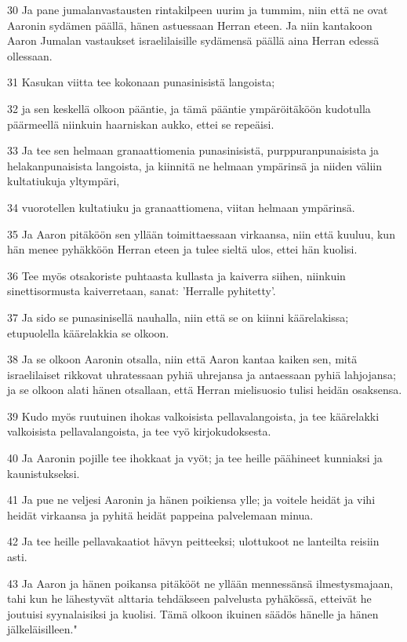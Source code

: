 \par 30 Ja pane jumalanvastausten rintakilpeen uurim ja tummim, niin että ne ovat Aaronin sydämen päällä, hänen astuessaan Herran eteen. Ja niin kantakoon Aaron Jumalan vastaukset israelilaisille sydämensä päällä aina Herran edessä ollessaan.
\par 31 Kasukan viitta tee kokonaan punasinisistä langoista;
\par 32 ja sen keskellä olkoon pääntie, ja tämä pääntie ympäröitäköön kudotulla päärmeellä niinkuin haarniskan aukko, ettei se repeäisi.
\par 33 Ja tee sen helmaan granaattiomenia punasinisistä, purppuranpunaisista ja helakanpunaisista langoista, ja kiinnitä ne helmaan ympärinsä ja niiden väliin kultatiukuja yltympäri,
\par 34 vuorotellen kultatiuku ja granaattiomena, viitan helmaan ympärinsä.
\par 35 Ja Aaron pitäköön sen yllään toimittaessaan virkaansa, niin että kuuluu, kun hän menee pyhäkköön Herran eteen ja tulee sieltä ulos, ettei hän kuolisi.
\par 36 Tee myös otsakoriste puhtaasta kullasta ja kaiverra siihen, niinkuin sinettisormusta kaiverretaan, sanat: 'Herralle pyhitetty'.
\par 37 Ja sido se punasinisellä nauhalla, niin että se on kiinni käärelakissa; etupuolella käärelakkia se olkoon.
\par 38 Ja se olkoon Aaronin otsalla, niin että Aaron kantaa kaiken sen, mitä israelilaiset rikkovat uhratessaan pyhiä uhrejansa ja antaessaan pyhiä lahjojansa; ja se olkoon alati hänen otsallaan, että Herran mielisuosio tulisi heidän osaksensa.
\par 39 Kudo myös ruutuinen ihokas valkoisista pellavalangoista, ja tee käärelakki valkoisista pellavalangoista, ja tee vyö kirjokudoksesta.
\par 40 Ja Aaronin pojille tee ihokkaat ja vyöt; ja tee heille päähineet kunniaksi ja kaunistukseksi.
\par 41 Ja pue ne veljesi Aaronin ja hänen poikiensa ylle; ja voitele heidät ja vihi heidät virkaansa ja pyhitä heidät pappeina palvelemaan minua.
\par 42 Ja tee heille pellavakaatiot hävyn peitteeksi; ulottukoot ne lanteilta reisiin asti.
\par 43 Ja Aaron ja hänen poikansa pitäkööt ne yllään mennessänsä ilmestysmajaan, tahi kun he lähestyvät alttaria tehdäkseen palvelusta pyhäkössä, etteivät he joutuisi syynalaisiksi ja kuolisi. Tämä olkoon ikuinen säädös hänelle ja hänen jälkeläisilleen."

